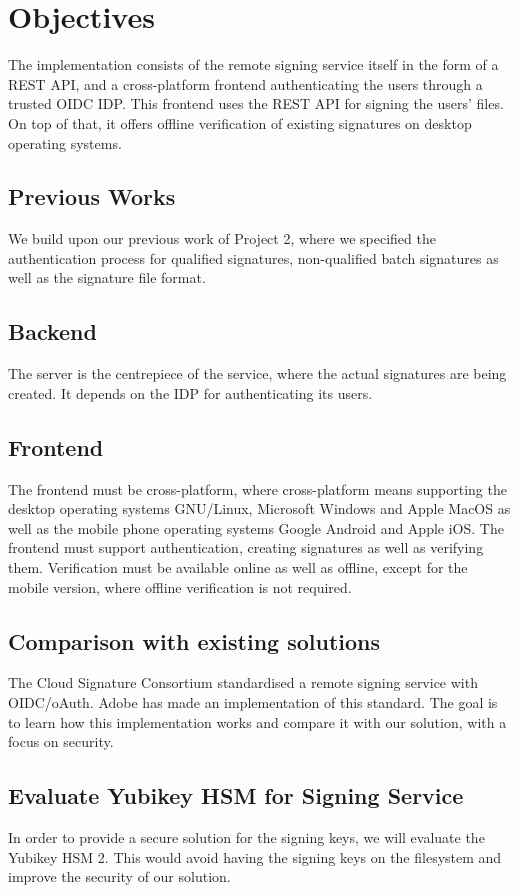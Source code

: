 \chapter*{Objectives}
\label{ch:objectives}

The implementation consists of the remote signing service itself in the form of a \gls{REST} \gls{API},
and a cross-platform frontend authenticating the users through a trusted \gls{OIDC} \gls{IDP}.
This frontend uses the \gls{REST} \gls{API} for signing the users' files.
On top of that, it offers offline verification of existing signatures on desktop operating systems.

\section{Previous Works}
\label{section:previousworks}

We build upon our previous work of Project 2\cite{projekt2}, where we specified the authentication process
for qualified signatures, non-qualified batch signatures as well as the signature file format.

\section{Backend}
\label{section:backend}

The server is the centrepiece of the service, where the actual signatures are being created.
It depends on the \gls{IDP} for authenticating its users.

\section{Frontend}
\label{section:frontend}

The frontend must be cross-platform, where cross-platform means supporting the desktop operating systems
GNU/Linux, Microsoft Windows and Apple MacOS as well as the mobile phone operating systems Google Android and Apple iOS.
The frontend must support authentication, creating signatures as well as verifying them.
Verification must be available online as well as offline, except for the mobile version, where offline verification is not required.

\section{Comparison with existing solutions}
\label{section:comparison}

The Cloud Signature Consortium standardised a remote signing service with OIDC/oAuth. Adobe has made an implementation of this standard.
The goal is to learn how this implementation works and compare it with our solution, with a focus on security.

\section{Evaluate Yubikey HSM for Signing Service}
\label{section:evaluateyubikey}

In order to provide a secure solution for the signing keys, we will evaluate the Yubikey HSM 2.
This would avoid having the signing keys on the filesystem and improve the security of our solution.